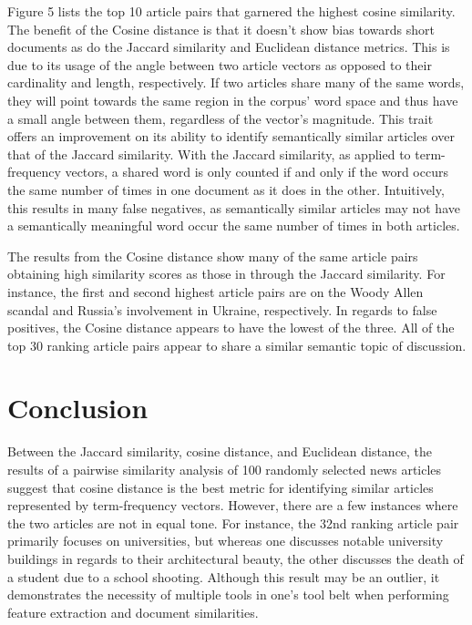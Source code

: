 \documentclass[11pt]{article}
\begin{document}
Figure 5 lists the top 10 article pairs that garnered the highest cosine similarity.
The benefit of the Cosine distance is that it doesn't show bias towards short documents as do the Jaccard similarity and Euclidean distance metrics.
This is due to its usage of the angle between two article vectors as opposed to their cardinality and length, respectively.
If two articles share many of the same words, they will point towards the same region in the corpus' word space and thus have a small angle between them, regardless of the vector's magnitude.
This trait offers an improvement on its ability to identify semantically similar articles over that of the Jaccard similarity.
With the Jaccard similarity, as applied to term-frequency vectors, a shared word is only counted if and only if the word occurs the same number of times in one document as it does in the other.
Intuitively, this results in many false negatives, as semantically similar articles may not have a semantically meaningful word occur the same number of times in both articles.

The results from the Cosine distance show many of the same article pairs obtaining high similarity scores as those in through the Jaccard similarity. For instance, the first and second highest article pairs are on the Woody Allen scandal and Russia's involvement in Ukraine, respectively.
In regards to false positives, the Cosine distance appears to have the lowest of the three.
All of the top 30 ranking article pairs appear to share a similar semantic topic of discussion.

\section{Conclusion} \label{sec:conclusion}

Between the Jaccard similarity, cosine distance, and Euclidean distance, the results of a pairwise similarity analysis of 100 randomly selected news articles suggest that cosine distance is the best metric for identifying similar articles represented by term-frequency vectors.
However, there are a few instances where the two articles are not in equal tone. For instance, the 32nd ranking article pair primarily focuses on universities, but whereas one discusses notable university buildings in regards to their architectural beauty, the other discusses the death of a student due to a school shooting.
Although this result may be an outlier, it demonstrates the necessity of multiple tools in one's tool belt when performing feature extraction and document similarities.
\end{document}
